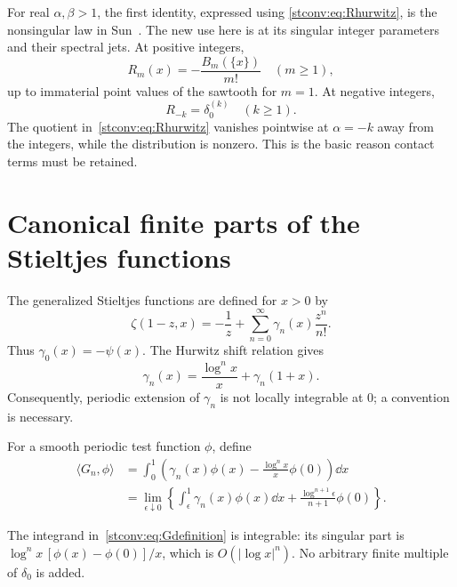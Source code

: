 For real $\alpha,\beta>1$, the first identity, expressed using
\eqref{stconv:eq:Rhurwitz}, is the nonsingular law in Sun~\cite[Remark 3.2]{stconv:Sun}.
The new use here is at its singular integer parameters and their spectral
jets. At positive integers,
\[
 R_m(x)=-\frac{B_m(\{x\})}{m!}\quad(m\ge1),
\]
up to immaterial point values of the sawtooth for $m=1$. At negative
integers,
\begin{equation}\label{stconv:eq:negativeR}
 R_{-k}=\delta_0^{(k)}\quad(k\ge1).
\end{equation}
The quotient in~\eqref{stconv:eq:Rhurwitz} vanishes pointwise at $\alpha=-k$
away from the integers, while the distribution is nonzero. This is the
basic reason contact terms must be retained.

\section{Canonical finite parts of the Stieltjes functions}
\label{stconv:sec:finiteparts}
The generalized Stieltjes functions are defined for $x>0$ by
\begin{equation}\label{stconv:eq:laurent}
 \zeta(1-z,x)=-\frac1z+\sum_{n=0}^\infty\gamma_n(x)\frac{z^n}{n!}.
\end{equation}
Thus $\gamma_0(x)=-\psi(x)$. The Hurwitz shift relation gives
\begin{equation}\label{stconv:eq:stshift}
 \gamma_n(x)=\frac{\log^n x}{x}+\gamma_n(1+x).
\end{equation}
Consequently, periodic extension of $\gamma_n$ is not locally integrable
at $0$; a convention is necessary.

\begin{definition}\label{stconv:def:G}
For a smooth periodic test function $\phi$, define
\begin{align}
 \langle G_n,\phi\rangle
 &=\int_0^1\left(\gamma_n(x)\phi(x)
       -\frac{\log^n x}{x}\phi(0)\right)\dd x\label{stconv:eq:Gdefinition}\\
 &=\lim_{\epsilon\downarrow0}\left\{
       \int_\epsilon^1\gamma_n(x)\phi(x)\dd x
       +\frac{\log^{n+1}\epsilon}{n+1}\phi(0)\right\}.
       \label{stconv:eq:Gcutoff}
\end{align}
\end{definition}
The integrand in~\eqref{stconv:eq:Gdefinition} is integrable: its singular part is
$\log^n x\,[\phi(x)-\phi(0)]/x$, which is $O(|\log x|^n)$.
No arbitrary finite multiple of $\delta_0$ is added.

